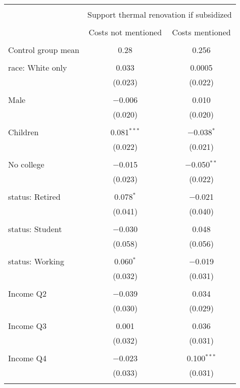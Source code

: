 
\begin{tabular}{@{\extracolsep{5pt}}lcc} 
\\[-1.8ex]\hline 
\hline \\[-1.8ex] 
 & \multicolumn{2}{c}{Support thermal renovation if subsidized} \\ 
\cline{2-3} 
\\[-1.8ex] & Costs not mentioned & Costs mentioned \\ 
\hline \\[-1.8ex] 
 Control group mean & 0.28 & 0.256  \\ \hline \\[-1.8ex] race: White only & 0.033 & 0.0005 \\ 
  & (0.023) & (0.022) \\ 
  & & \\ 
 Male & $-$0.006 & 0.010 \\ 
  & (0.020) & (0.020) \\ 
  & & \\ 
 Children & 0.081$^{***}$ & $-$0.038$^{*}$ \\ 
  & (0.022) & (0.021) \\ 
  & & \\ 
 No college & $-$0.015 & $-$0.050$^{**}$ \\ 
  & (0.023) & (0.022) \\ 
  & & \\ 
 status: Retired & 0.078$^{*}$ & $-$0.021 \\ 
  & (0.041) & (0.040) \\ 
  & & \\ 
 status: Student & $-$0.030 & 0.048 \\ 
  & (0.058) & (0.056) \\ 
  & & \\ 
 status: Working & 0.060$^{*}$ & $-$0.019 \\ 
  & (0.032) & (0.031) \\ 
  & & \\ 
 Income Q2 & $-$0.039 & 0.034 \\ 
  & (0.030) & (0.029) \\ 
  & & \\ 
 Income Q3 & 0.001 & 0.036 \\ 
  & (0.032) & (0.031) \\ 
  & & \\ 
 Income Q4 & $-$0.023 & 0.100$^{***}$ \\ 
  & (0.033) & (0.031) \\ 
  & & \\ 

\end{tabular}
